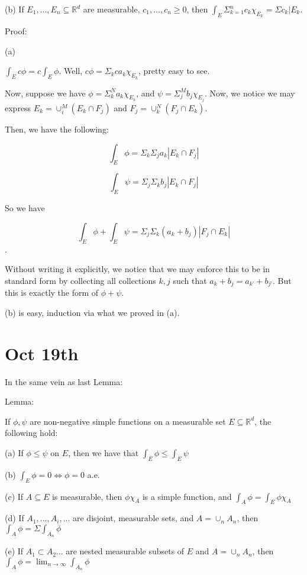 \documentclass[10pt]{article}
\begin{document}
(b) If $E_1,...,E_n \subseteq \mathbb{R}^d$ are measurable, $c_1,...,c_n \geq 0$, then $\int_E \Sigma_{k=1}^n c_k \chi_{E_k} = \Sigma c_k |E_k$.

Proof:

(a)

$\int_E c \phi =  c \int_E \phi$. Well, $c \phi = \Sigma_k c a_k \chi_{E_k}$, pretty easy to see.

Now, suppose we have $\phi = \Sigma_{k}^N a_k \chi_{E_k}$, and $\psi = \Sigma_{j}^M b_j \chi_{E_j}$. Now, we notice we may express $E_k = \cup_i^M (E_k \cap F_j)$ and $F_j = \cup_k^N (F_j \cap E_k)$.

Then, we have the following:

$$ \int_E \phi = \Sigma_k \Sigma_j a_k | E_k \cap F_j|$$

$$\int_E \psi = \Sigma_j \Sigma_k b_j | E_k \cap F_j|$$

So we have 

$$ \int_E \phi + \int_E \psi = \Sigma_j \Sigma_k (a_k + b_j) | F_j \cap E_k|$$.

Without writing it explicitly, we notice that we may enforce this to be in standard form by collecting all collections $k,j$ such that $a_k + b_j = a_{k’} + b_{j’}$. But this is exactly the form of $\phi + \psi$. 

(b) is easy, induction via what we proved in (a).

\section*{Oct 19th}

In the same vein as last Lemma:

Lemma:

If $\phi, \psi$ are non-negative simple functions on a measurable set $E \subseteq \mathbb{R}^d$, the following hold:

(a) If $\phi \leq \psi$ on $E$, then we have that $\int_E \phi \leq \int_E \psi$

(b) $\int_E \phi = 0 \iff \phi = 0$ a.e.

(c) If $A \subseteq E$ is measurable, then $\phi \chi_A$ is a simple function, and $\int_A \phi = \int_E \phi \chi_A$

(d) If $A_1,...,A_i,...$ are disjoint, measurable sets, and $A = \cup_n A_n$, then $\int_A \phi = \Sigma \int_{A_n} \phi$

(e) If $A_1 \subset A_2 ...$ are nested measurable subsets of $E$ and $A = \cup_n A_n$, then $\int_A \phi = \lim_{n \to \infty} \int_{A_n} \phi$
\end{document}
